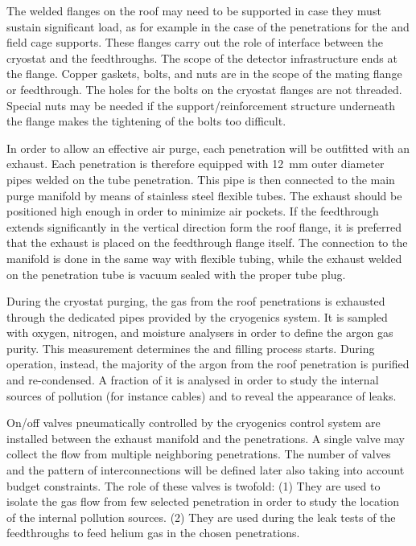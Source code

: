 The welded flanges on the roof may need to be supported in case they must sustain significant load, as for example in the case of the penetrations for the  and field cage supports.
These flanges carry out the role of interface between the cryostat and the feedthroughs.
The scope of the detector infrastructure ends at the flange.
Copper gaskets, bolts, and nuts are in the scope of the mating flange or feedthrough.
The holes for the bolts on the cryostat flanges are not threaded.
Special nuts may be needed if the support/reinforcement structure underneath the flange makes the tightening of the bolts too difficult.

In order to allow an effective air purge, each penetration will be outfitted with an exhaust. Each penetration is therefore equipped with 12~mm outer diameter pipes welded on the tube penetration.
This pipe is then connected to the main purge manifold by means of stainless steel flexible tubes.
The exhaust should be positioned high enough in order to minimize air pockets.
If the feedthrough extends significantly in the vertical direction form the roof flange, it is preferred that the exhaust is placed on the feedthrough flange itself.
The connection to the manifold is done in the same way with flexible tubing, while the exhaust welded on the penetration tube is vacuum sealed with the proper tube plug.

During the cryostat purging, the gas from the roof penetrations is exhausted through the dedicated pipes provided by the cryogenics system.
It is sampled with oxygen, nitrogen, and moisture analysers in order to define the argon gas purity.
This measurement determines the \cooldown and  filling process starts.
During operation, instead, the majority of the argon from the roof penetration is purified and re-condensed.
A fraction of it is analysed in order to study the internal sources of pollution (for instance cables) and to reveal the appearance of leaks.

On/off valves pneumatically controlled by the cryogenics control system are installed between the exhaust manifold and the penetrations.
A single valve may collect the flow from multiple neighboring penetrations.
The number of valves and the pattern of interconnections will be defined later also taking into account budget constraints.
The role of these valves is twofold: (1) They are used to isolate the gas flow from few selected penetration in order to study the location of the internal pollution sources. (2) They are used during the leak tests of the feedthroughs to feed helium gas in the chosen penetrations.

